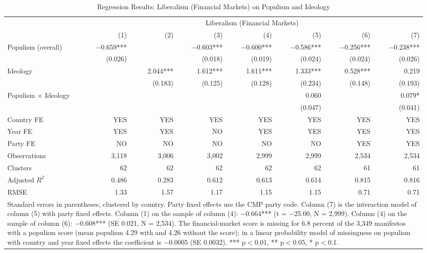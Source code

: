 \begin{table}
\caption{Regression Results: Liberalism (Financial Markets) on Populism and Ideology}
\label{tab:8}
\scriptsize\setlength{\tabcolsep}{4pt}
\centering
\begin{tabular}{lrrrrrrr}
\toprule
 & \multicolumn{7}{c}{Liberalism (Financial Markets)} \\
 & (1) & (2) & (3) & (4) & (5) & (6) & (7) \\
 \midrule
Populism (overall) & $-$0.659*** &  & $-$0.603*** & $-$0.600*** & $-$0.586*** & $-$0.256*** & $-$0.238*** \\
& (0.026) &  & (0.018) & (0.019) & (0.024) & (0.024) & (0.026) \\
Ideology &  & 2.044*** & 1.612*** & 1.611*** & 1.333*** & 0.528*** & 0.219 \\
&  & (0.183) & (0.125) & (0.128) & (0.234) & (0.148) & (0.193) \\
Populism $\times$ Ideology &  &  &  &  & 0.060 &  & 0.079* \\
&  &  &  &  & (0.047) &  & (0.041) \\
\midrule
Country FE & YES & YES & YES & YES & YES & YES & YES\\
Year FE & YES & YES & NO & YES & YES & YES & YES\\
Party FE & NO & NO & NO & NO & NO & YES & YES\\
Observations & 3,118 & 3,006 & 3,002 & 2,999 & 2,999 & 2,534 & 2,534 \\
Clusters & 62 & 62 & 62 & 62 & 62 & 61 & 61 \\
Adjusted $R^2$ & 0.486 & 0.283 & 0.612 & 0.613 & 0.614 & 0.815 & 0.816 \\
RMSE & 1.33 & 1.57 & 1.17 & 1.15 & 1.15 & 0.71 & 0.71 \\
\bottomrule
\multicolumn{8}{p{0.9\linewidth}}{\scriptsize Standard errors in parentheses, clustered by country. Party fixed effects use the CMP party code. Column (7) is the interaction model of column (5) with party fixed effects. Column (1) on the sample of column (4): $-$0.664*** (t = $-$25.00, N = 2,999). Column (4) on the sample of column (6): $-$0.608*** (SE 0.021, N = 2,534). The financial-market score is missing for 6.8 percent of the 3,349 manifestos with a populism score (mean populism 4.29 with and 4.26 without the score); in a linear probability model of missingness on populism with country and year fixed effects the coefficient is $-$0.0005 (SE 0.0032). *** p$<$0.01, ** p$<$0.05, * p$<$0.1.} \\
\end{tabular}
\end{table}
